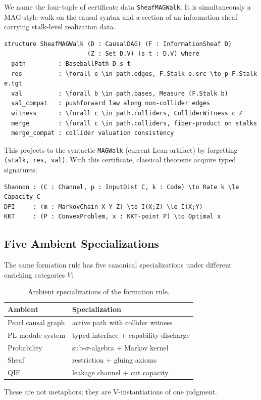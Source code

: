 \documentclass[acmsmall,screen,nonacm]{acmart}
\newcommand{\lean}[1]{\lstinline!#1!}
\begin{document}
We name the four-tuple of certificate data \lean{SheafMAGWalk}. It is simultaneously a MAG-style walk on the causal syntax and a section of an information sheaf carrying stalk-level realization data.

\begin{lstlisting}
structure SheafMAGWalk (D : CausalDAG) (F : InformationSheaf D)
                       (Z : Set D.V) (s t : D.V) where
  path         : BaseballPath D s t
  res          : \forall e \in path.edges, F.Stalk e.src \to_p F.Stalk e.tgt
  val          : \forall b \in path.bases, Measure (F.Stalk b)
  val_compat   : pushforward law along non-collider edges
  witness      : \forall c \in path.colliders, ColliderWitness c Z
  merge        : \forall c \in path.colliders, fiber-product on stalks
  merge_compat : collider valuation consistency
\end{lstlisting}

This projects to the syntactic \lean{MAGWalk} (current Lean artifact) by forgetting \lean{(stalk, res, val)}. With this certificate, classical theorems acquire typed signatures:
\begin{lstlisting}
Shannon : (C : Channel, p : InputDist C, k : Code) \to Rate k \le Capacity C
DPI     : (m : MarkovChain X Y Z) \to I(X;Z) \le I(X;Y)
KKT     : (P : ConvexProblem, x : KKT-point P) \to Optimal x
\end{lstlisting}

\subsection{Five Ambient Specializations}
The same formation rule has five canonical specializations under different enriching categories $V$:
\begin{table}[ht]
\centering
\caption{Ambient specializations of the formation rule.}
\begin{tabular}{ll}
\toprule
Ambient & Specialization \\
\midrule
Pearl causal graph & active path with collider witness \\
PL module system & typed interface + capability discharge \\
Probability & sub-$\sigma$-algebra + Markov kernel \\
Sheaf & restriction + gluing axioms \\
QIF & leakage channel + cut capacity \\
\bottomrule
\end{tabular}
\end{table}
These are not metaphors; they are V-instantiations of one judgment.
\end{document}
